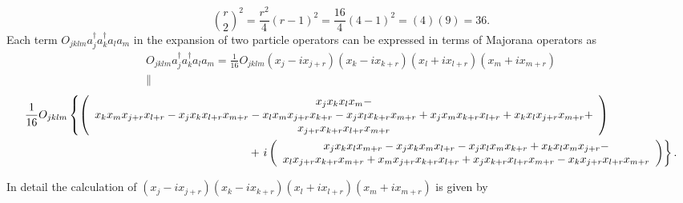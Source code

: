 \documentclass[aps,preprint]{revtex4}%
\begin{document}
\begin{equation}
\binom{r}{2}^{2}=\frac{r^{2}}{4}\left(  r-1\right)  ^{2}=\frac{16}{4}\left(
4-1\right)  ^{2}=\left(  4\right)  \left(  9\right)  =36.
\end{equation}
Each term $O_{jklm}a_{j}^{\dagger}a_{k}^{\dagger}a_{l}a_{m}$ in the expansion
of two particle operators can be expressed in terms of Majorana operators as
\begin{gather}
O_{jklm}a_{j}^{\dagger}a_{k}^{\dagger}a_{l}a_{m}=\frac{1}{16}O_{jklm}%
(x_{j}-ix_{j+r})(x_{k}-ix_{k+r})(x_{l}+ix_{l+r})(x_{m}+ix_{m+r})\\
\parallel
\end{gather}%
\begin{align}
&  \frac{1}{16}O_{jklm}\left\{  \left(
\begin{array}
[c]{c}%
x_{j}x_{k}x_{l}x_{m}-\\
x_{k}x_{m}x_{j+r}x_{l+r}-x_{j}x_{k}x_{l+r}x_{m+r}-x_{l}x_{m}x_{j+r}%
x_{k+r}-x_{j}x_{l}x_{k+r}x_{m+r}+x_{j}x_{m}x_{k+r}x_{l+r}+x_{k}x_{l}%
x_{j+r}x_{m+r}+\\
x_{j+r}x_{k+r}x_{l+r}x_{m+r}%
\end{array}
\right)  \right. \\
&  \qquad\qquad\qquad\qquad\qquad\qquad\qquad\qquad\qquad\qquad+\left.
i\left(
\begin{array}
[c]{c}%
x_{j}x_{k}x_{l}x_{m+r}-x_{j}x_{k}x_{m}x_{l+r}-x_{j}x_{l}x_{m}x_{k+r}%
+x_{k}x_{l}x_{m}x_{j+r}-\\
x_{l}x_{j+r}x_{k+r}x_{m+r}+x_{m}x_{j+r}x_{k+r}x_{l+r}+x_{j}x_{k+r}%
x_{l+r}x_{m+r}-x_{k}x_{j+r}x_{l+r}x_{m+r}%
\end{array}
\right)  \right\}  .
\end{align}


In detail the calculation of $\left(  x_{j}-ix_{j+r}\right)  (x_{k}%
-ix_{k+r})(x_{l}+ix_{l+r})(x_{m}+ix_{m+r})$ is given by
\end{document}
